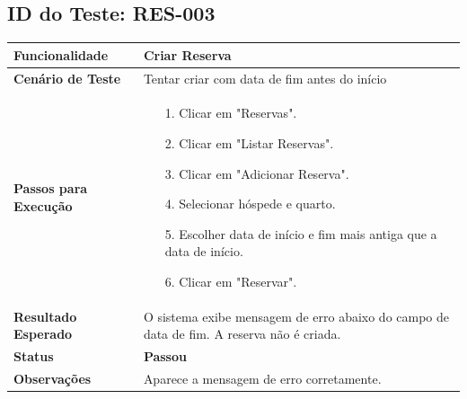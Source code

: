 \documentclass[
	12pt,				%
	openany,			%
	oneside,			%
	a4paper,			%
	english,			%
	french,				%
	spanish,			%
	brazil				%
	]{abntex2}
\begin{document}
\begin{apendicesenv}
\subsection*{ID do Teste: RES-003}
\begin{tabular}{@{} p{5cm} p{11cm} @{}}
	\toprule
	\textbf{Funcionalidade} & Criar Reserva \\
	\midrule
	\textbf{Cenário de Teste} & Tentar criar com data de fim antes do início \\
	\midrule
	\textbf{Passos para Execução} &
	\begin{itemize} \itemsep0em 
		\item[1.] Clicar em "Reservas".
		\item[2.] Clicar em "Listar Reservas".
		\item[3.] Clicar em "Adicionar Reserva".
		\item[4.] Selecionar hóspede e quarto.
		\item[5.] Escolher data de início e fim mais antiga que a data de início.
		\item[6.] Clicar em "Reservar".
	\end{itemize} \\
	\midrule
	\textbf{Resultado Esperado} & O sistema exibe mensagem de erro abaixo do campo de data de fim. A reserva não é criada. \\
	\midrule
	\textbf{Status} & \textbf{Passou} \\
	\midrule
	\textbf{Observações} & Aparece a mensagem de erro corretamente. \\
	\bottomrule
\end{tabular}
\newpage


\end{apendicesenv}
\end{document}
